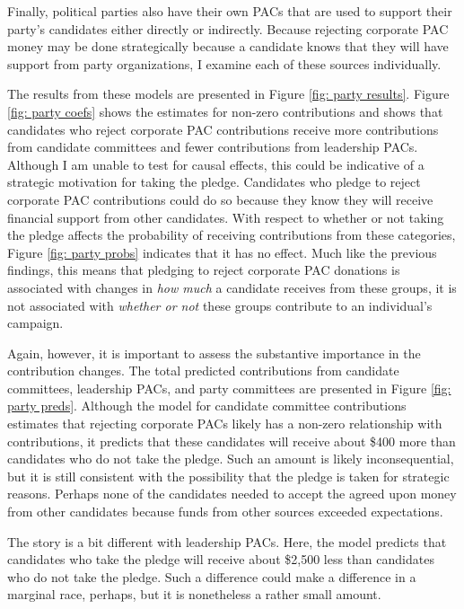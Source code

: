 \documentclass[12pt]{article}
\begin{document}
Finally, political parties also have their own PACs that are used to support their party's candidates either directly or indirectly. Because rejecting corporate PAC money may be done strategically because a candidate knows that they will have support from party organizations, I examine each of these sources individually.  

The results from these models are presented in Figure \ref{fig: party results}. Figure \ref{fig: party coefs} shows the estimates for non-zero contributions and shows that candidates who reject corporate PAC contributions receive more contributions from candidate committees and fewer contributions from leadership PACs. Although I am unable to test for causal effects, this could be indicative of a strategic motivation for taking the pledge. Candidates who pledge to reject corporate PAC contributions could do so because they know they will receive financial support from other candidates. With respect to whether or not taking the pledge affects the probability of receiving contributions from these categories, Figure \ref{fig: party probs} indicates that it has no effect. Much like the previous findings, this means that pledging to reject corporate PAC donations is associated with changes in \emph{how much} a candidate receives from these groups, it is not associated with \emph{whether or not} these groups contribute to an individual's campaign. 

Again, however, it is important to assess the substantive importance in the contribution changes. The total predicted contributions from candidate committees, leadership PACs, and party committees are presented in Figure \ref{fig: party preds}. Although the model for candidate committee contributions estimates that rejecting corporate PACs likely has a non-zero relationship with contributions, it predicts that these candidates will receive about \$400 more than candidates who do not take the pledge. Such an amount is likely inconsequential, but it is still consistent with the possibility that the pledge is taken for strategic reasons. Perhaps none of the candidates needed to accept the agreed upon money from other candidates because funds from other sources exceeded expectations. 

The story is a bit different with leadership PACs. Here, the model predicts that candidates who take the pledge will receive about \$2,500 less than candidates who do not take the pledge. Such a difference could make a difference in a marginal race, perhaps, but it is nonetheless a rather small amount.    
\end{document}
